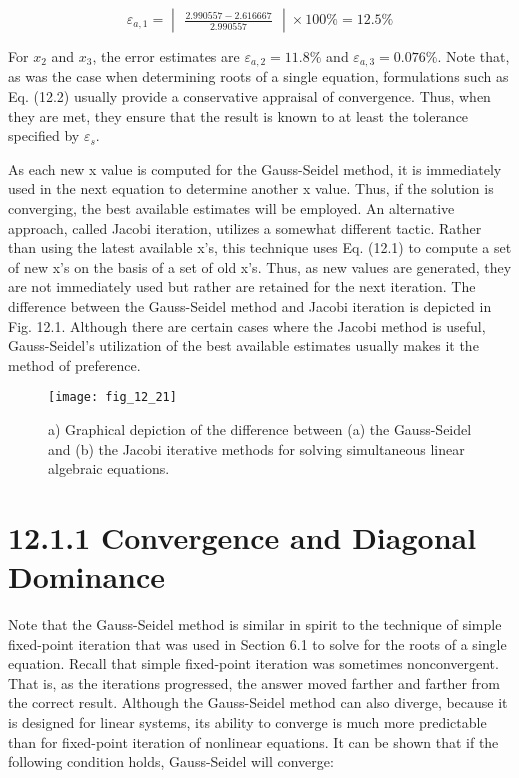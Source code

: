 \documentclass[../main.tex]{subfiles}
\begin{document}
\begin{equation}
\varepsilon _{a,1}=\begin{vmatrix}
\frac{2.990557-2.616667}{2.990557}
\end{vmatrix}\times 100\%=12.5\%
\end{equation}

For $x_{2}$ and $x_{3}$, the error estimates are $\varepsilon_{a,2}=11.8\%$ and $\varepsilon_{a,3}=0.076\%$. Note that, as was
the case when determining roots of a single equation, formulations such as Eq. (12.2) usually provide a conservative appraisal of convergence. Thus, when they are met, they ensure that the result is known to at least the tolerance specified by $\varepsilon_{s}$.


As each new x value is computed for the Gauss-Seidel method, it is immediately used
in the next equation to determine another x value. Thus, if the solution is converging, the
best available estimates will be employed. An alternative approach, called Jacobi iteration,
utilizes a somewhat different tactic. Rather than using the latest available x's,
this technique uses Eq. (12.1) to compute a set of new x's on the basis of a set of old x's. Thus, as
new values are generated, they are not immediately used but rather are retained for the next
iteration.
The difference between the Gauss-Seidel method and Jacobi iteration is depicted in
Fig. 12.1. Although there are certain cases where the Jacobi method is useful, Gauss-Seidel's
utilization of the best available estimates usually makes it the method of preference.


\begin{figure}[H]
		\centering
		\texttt{[image: fig\_12\_21]}
	   \caption{\textsf{a) Graphical depiction of the difference between (a) the Gauss-Seidel and (b) the Jacobi iterative
methods for solving simultaneous linear algebraic equations.}}
	   \label{fig:fig_12_21}
\end{figure}


\section*{12.1.1 Convergence and Diagonal Dominance}

Note that the Gauss-Seidel method is similar in spirit to the technique of simple fixed-point
iteration that was used in Section 6.1 to solve for the roots of a single equation. Recall that
simple fixed-point iteration was sometimes nonconvergent. That is, as the iterations progressed, the answer moved farther and farther from the correct result.
Although the Gauss-Seidel method can also diverge, because it is designed for linear
systems, its ability to converge is much more predictable than for fixed-point iteration of
nonlinear equations. It can be shown that if the following condition holds, Gauss-Seidel
will converge:
\end{document}

